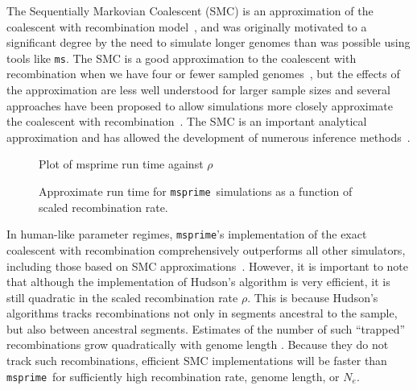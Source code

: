 \documentclass{article}
\newcommand{\msprime}[0]{\texttt{msprime}}
\newcommand{\ms}[0]{\texttt{ms}}
\begin{document}
The Sequentially Markovian Coalescent (SMC) is an approximation of the
coalescent with recombination
model~\citep{mcvean2005approximating,marjoram2006fast},
and was originally motivated to a significant degree by the need to
simulate longer genomes than was possible using tools like \ms.
The SMC is a good approximation to the
coalescent with recombination when we have four or fewer sampled
genomes~\citep{hobolth2014markovian,wilton2015smc}, but the
effects of the approximation are less well understood for larger
sample sizes and several approaches have been proposed to
allow simulations more closely approximate the coalescent
with recombination~\citep{chen2009fast,wang2014new,staab2015scrm}.
The SMC is an important analytical approximation
and has allowed the development of numerous inference
methods~\citep{
li2011inference,
harris2013inferring,
sheehan2013estimating,
schiffels2014inferring,
carmi2014renewal,
rasmussen2014genome,
zheng2014bayesian,
terhorst2017robust}.

\begin{figure}
\Large{Plot of msprime run time against $\rho$}
\caption{\label{fig-recombination-perf} Approximate run time for \msprime\
simulations as a function of scaled recombination rate.
}
\end{figure}

In human-like parameter regimes, \msprime's implementation of the
exact coalescent with recombination comprehensively outperforms
all other simulators, including those based on SMC
approximations~\citep{kelleher2016efficient}. However, it is important
to note that although the implementation of Hudson's algorithm is
very efficient, it is still quadratic in the scaled recombination rate
$\rho$. This is because Hudson's algorithms tracks recombinations not only
in segments ancestral to the sample, but also between ancestral segments.
Estimates of the number of such ``trapped'' recombinations grow quadratically
with genome length \citep[Eq.~5.10]{hein2004gene}.
Because they do not track such recombinations, efficient SMC implementations
will be faster than \msprime\ for sufficiently high recombination rate,
genome length, or $N_e$. %
\end{document}
